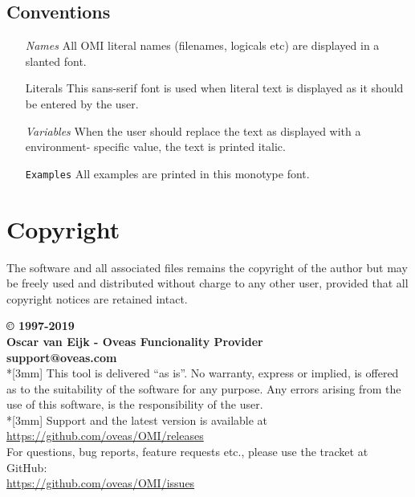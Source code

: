 \documentclass[a4paper]{book}
\renewcommand{\indent}{\hspace*{5mm}}
\begin{document}
\subsection*{Conventions}

\begin{itemize}
\item[\textsl{Names}] All OMI literal names (filenames, logicals etc) are
displayed in a slanted font.
\item[\textsf{Literals}] This sans-serif font is used when literal text is
displayed as it should be entered by the user.
\item[\textsf{\textit{Variables}}] When the user should replace the text as
displayed with a environment- specific value, the text is printed italic.
\item[\texttt{Examples}] All examples are printed in this monotype font.
\end{itemize}

\section*{Copyright}
\label{subsec:copyrightbrary}

The software and all associated files remains the copyright of the author 
but may be freely used and distributed without charge to any other user, 
provided that all copyright notices are retained intact.

\noindent\textbf{{\copyright} 1997-2019\\
Oscar van Eijk - Oveas Funcionality Provider\\
support@oveas.com}\\*[3mm]
This tool is delivered ``as is''. No warranty, express or implied, is 
offered as to the suitability of the software for any purpose. Any errors 
arising from the use of this software, is the responsibility of the user.\\*[3mm]
Support and the latest version is available at \\
\indent\url{https://github.com/oveas/OMI/releases} \\
For questions, bug reports, feature requests etc., please use the tracket at GitHub: \\
\indent\url{https://github.com/oveas/OMI/issues}
\end{document}
